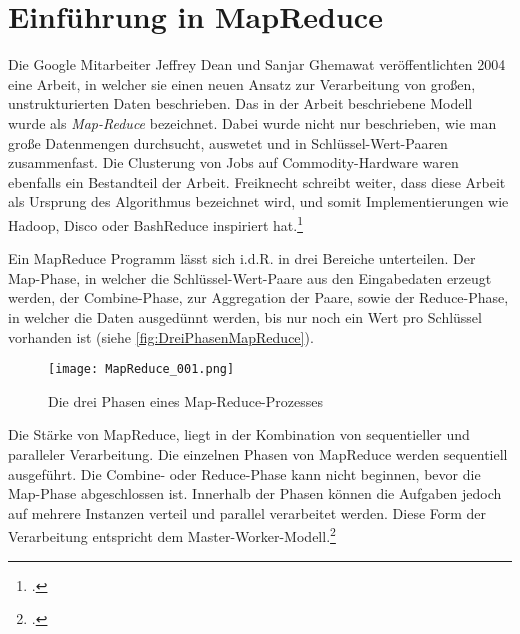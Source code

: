 

\section{Einführung in MapReduce}\label{sec:EinführungInMapReduce}
Die Google Mitarbeiter Jeffrey Dean und Sanjar Ghemawat veröffentlichten 2004 eine Arbeit, in welcher sie einen neuen Ansatz zur Verarbeitung von großen, unstrukturierten Daten beschrieben. Das in der Arbeit beschriebene Modell wurde als \textit{Map-Reduce} bezeichnet. Dabei wurde nicht nur beschrieben, wie man große Datenmengen durchsucht, auswetet und in Schlüssel-Wert-Paaren zusammenfast. Die Clusterung von Jobs auf \gls{Commodity-Hardware} waren ebenfalls ein Bestandteil der Arbeit. Freiknecht schreibt weiter, dass diese Arbeit als Ursprung des Algorithmus bezeichnet wird, und somit Implementierungen wie Hadoop, Disco oder BashReduce inspiriert hat.\footcite[Vgl.][S. 42]{Freiknecht.2014}

Ein MapReduce Programm lässt sich i.d.R. in drei Bereiche unterteilen. Der Map-Phase, in welcher die Schlüssel-Wert-Paare aus den Eingabedaten erzeugt werden, der Combine-Phase, zur Aggregation der Paare, sowie der Reduce-Phase, in welcher die Daten ausgedünnt werden, bis nur noch ein Wert pro Schlüssel vorhanden ist (siehe \autoref{fig:DreiPhasenMapReduce}).

\begin{figure}[h]
	\centering
	\texttt{[image: MapReduce\_001.png]}
	\caption{Die drei Phasen eines Map-Reduce-Prozesses\footnotemark}
	\label{fig:DreiPhasenMapReduce}
\end{figure}

Die Stärke von MapReduce, liegt in der Kombination von sequentieller und paralleler Verarbeitung. Die einzelnen Phasen von MapReduce werden sequentiell ausgeführt. Die Combine- oder Reduce-Phase kann nicht beginnen, bevor die Map-Phase abgeschlossen ist. Innerhalb der Phasen können die Aufgaben jedoch auf mehrere Instanzen verteil und parallel verarbeitet werden. Diese Form der Verarbeitung entspricht dem Master-Worker-Modell.\footcite[Vgl.][S.1 f]{Karloff.2010}

